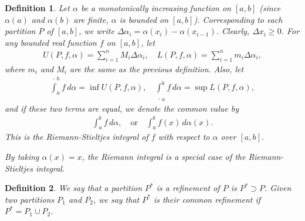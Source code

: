 \documentclass[11pt]{book}
\newtheorem{definition}{Definition}[chapter]
\theoremstyle{definition}
\numberwithin{equation}{chapter}
\begin{document}
\begin{definition}
Let $\alpha$ be a monotonically increasing function on $[a,b]$ (since $\alpha(a)$ and $\alpha(b)$ are finite, $\alpha$ is bounded on $[a,b]$). Corresponding to each partition $P$ of $[a,b]$, we write $\Delta \alpha_i = \alpha(x_i) - \alpha(x_{i-1})$. Clearly, $\Delta x_i \geq 0$. For any bounded real function $f$ on $[a,b]$, let
\begin{align*}
    U(P,f,\alpha) = \sum^n_{i=1} M_i \Delta \alpha_i, \quad L(P,f,\alpha) = \sum^n_{i=1} m_i \Delta \alpha_i,
\end{align*}
where $m_i$ and $M_i$ are the same as the previous definition. Also, let
\begin{align*}
    \overline{\int}^b_a f \,d\alpha = \inf U(P,f,\alpha), \quad \underline{\int}^b_a f \,d\alpha = \sup L(P,f,\alpha),
\end{align*}
and if these two terms are equal, we denote the common value by
\begin{align*}
    \int^b_a f \,d\alpha, \quad \text{or} \quad \int^b_a f(x) \,d\alpha(x).
\end{align*}
This is the Riemann-Stieltjes integral of $f$ with respect to $\alpha$ over $[a,b]$. 

By taking $\alpha(x) = x$, the Riemann integral is a special case of the Riemann-Stieltjes integral. 
\end{definition}

\medskip

\begin{definition}
We say that a partition $P^*$ is a refinement of $P$ is  $P^* \supset P$. Given two partitions $P_1$ and $P_2$, we say that $P^*$ is their common refinement if $P^* = P_1 \cup P_2$.
\end{definition}


\medskip
\end{document}
